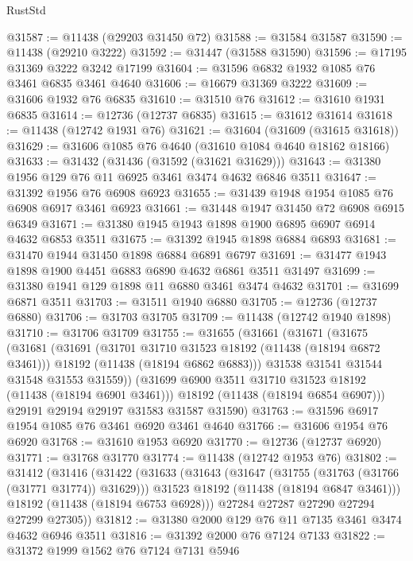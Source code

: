 \begin{lexlean}{RustStd}
\begin{coremodule}
@31587 := @11438 (@29203 @31450 @72)
@31588 := @31584 @31587
@31590 := @11438 (@29210 @3222)
@31592 := @31447 (@31588 @31590)
@31596 := @17195 @31369 @3222 @3242 @17199
@31604 := @31596 @6832 @1932 @1085 @76 @3461 @6835 @3461 @4640
@31606 := @16679 @31369 @3222
@31609 := @31606 @1932 @76 @6835
@31610 := @31510 @76
@31612 := @31610 @1931 @6835
@31614 := @12736 (@12737 @6835)
@31615 := @31612 @31614
@31618 := @11438 (@12742 @1931 @76)
@31621 := @31604 (@31609 (@31615 @31618))
@31629 := @31606 @1085 @76 @4640 (@31610 @1084 @4640 @18162 @18166)
@31633 := @31432 (@31436 (@31592 (@31621 @31629)))
@31643 := @31380 @1956 @129 @76 @11 @6925 @3461 @3474 @4632 @6846 @3511
@31647 := @31392 @1956 @76 @6908 @6923
@31655 := @31439 @1948 @1954 @1085 @76 @6908 @6917 @3461 @6923
@31661 := @31448 @1947 @31450 @72 @6908 @6915 @6349
@31671 := @31380 @1945 @1943 @1898 @1900 @6895 @6907 @6914 @4632 @6853 @3511
@31675 := @31392 @1945 @1898 @6884 @6893
@31681 := @31470 @1944 @31450 @1898 @6884 @6891 @6797
@31691 := @31477 @1943 @1898 @1900 @4451 @6883 @6890 @4632 @6861 @3511 @31497
@31699 := @31380 @1941 @129 @1898 @11 @6880 @3461 @3474 @4632
@31701 := @31699 @6871 @3511
@31703 := @31511 @1940 @6880
@31705 := @12736 (@12737 @6880)
@31706 := @31703 @31705
@31709 := @11438 (@12742 @1940 @1898)
@31710 := @31706 @31709
@31755 := @31655
    (@31661
      (@31671
        (@31675
          (@31681
            (@31691
              (@31701 @31710 @31523 @18192 (@11438 (@18194 @6872 @3461)))
              @18192
              (@11438 (@18194 @6862 @6883)))
            @31538
            @31541
            @31544
            @31548
            @31553
            @31559))
        (@31699 @6900 @3511 @31710 @31523 @18192 (@11438 (@18194 @6901 @3461)))
        @18192
        (@11438 (@18194 @6854 @6907)))
      @29191
      @29194
      @29197
      @31583
      @31587
      @31590)
@31763 := @31596 @6917 @1954 @1085 @76 @3461 @6920 @3461 @4640
@31766 := @31606 @1954 @76 @6920
@31768 := @31610 @1953 @6920
@31770 := @12736 (@12737 @6920)
@31771 := @31768 @31770
@31774 := @11438 (@12742 @1953 @76)
@31802 := @31412
    (@31416
      (@31422
        (@31633
          (@31643
            (@31647 (@31755 (@31763 (@31766 (@31771 @31774)) @31629)))
            @31523
            @18192
            (@11438 (@18194 @6847 @3461)))
          @18192
          (@11438 (@18194 @6753 @6928)))
        @27284
        @27287
        @27290
        @27294
        @27299
        @27305))
@31812 := @31380 @2000 @129 @76 @11 @7135 @3461 @3474 @4632 @6946 @3511
@31816 := @31392 @2000 @76 @7124 @7133
@31822 := @31372 @1999 @1562 @76 @7124 @7131 @5946

\end{coremodule}
\end{lexlean}
